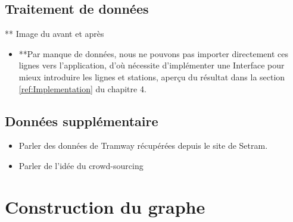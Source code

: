 \subsection{Traitement de données}

** Image du avant et après

\begin{itemize}
	\item **Par manque de données, nous ne pouvons pas importer directement ces lignes vers l'application, d'où nécessite d'implémenter une Interface pour mieux introduire les lignes et stations, aperçu du résultat dans la section \ref{ref:Implementation} du chapitre 4.
\end{itemize}

\subsection{Données supplémentaire}
	\begin{itemize}
		\item Parler des données de Tramway récupérées depuis le site de Setram.
		\item Parler de l'idée du crowd-sourcing
	\end{itemize}
	
\section{Construction du graphe}
